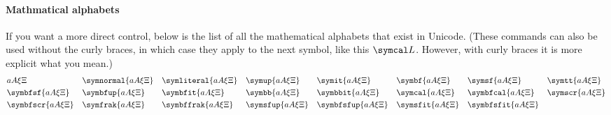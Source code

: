 \documentclass{article}
\begin{document}
\paragraph{Mathmatical alphabets} If you want a more direct control, below is the list of all the mathematical alphabets that exist in Unicode. (These commands can also be used without the curly braces, in which case they apply to the next symbol, like this $\symcal L$. However, with curly braces it is more explicit what you mean.)
\begin{align*}
    &a A \xi \Xi                &
    &\symnormal{a A \xi \Xi}    &
    &\symliteral{a A \xi \Xi}   &
    &\symup{a A \xi \Xi}    &
    &\symit{a A \xi \Xi}    &
    &\symbf{a A \xi \Xi}   &
    &\symsf{a A \xi \Xi}    &
    &\symtt{a A \xi \Xi}    \\
    &\symbfsf{a A \xi \Xi}   &
    &\symbfup{a A \xi \Xi}   &
    &\symbfit{a A \xi \Xi}   &
    &\symbb{a A \xi \Xi}   &
    &\symbbit{a A \xi \Xi}   &
    &\symcal{a A \xi \Xi}   &
    &\symbfcal{a A \xi \Xi}   &
    &\symscr{a A \xi \Xi}    \\
    &\symbfscr{a A \xi \Xi}   &
    &\symfrak{a A \xi \Xi}   &
    &\symbffrak{a A \xi \Xi}   &
    &\symsfup{a A \xi \Xi}   &
    &\symbfsfup{a A \xi \Xi}    &
    &\symsfit{a A \xi \Xi}    &
    &\symbfsfit{a A \xi \Xi} \\
\end{align*}
\end{document}
